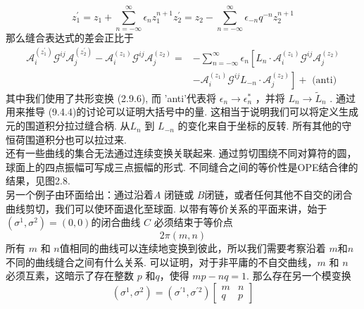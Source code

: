 \begin{subequations}
\begin{equation}
		z_{1}^{\prime}=z_{1}+\sum_{n=-\infty}^{\infty} \epsilon_{n} z_{1}^{n+1} 
\end{equation}
\begin{equation}		
		z_{2}^{\prime}=z_{2}-\sum_{n=-\infty}^{\infty} \epsilon_{-n} q^{-n} z_{2}^{n+1}
\end{equation}
\end{subequations}
那么缝合表达式的差会正比于
\begin{equation}
	\begin{aligned}
		\mathscr{A}_{i}^{\left(z_{1}^{\prime}\right)} \mathscr{G}^{i j} \mathscr{A}_{j}^{\left(z_{2}^{\prime}\right)}-\mathscr{A}_{i}^{\left(z_{1}\right)} \mathscr{G}^{i j} \mathscr{A}_{j}^{\left(z_{2}\right)}=&-\sum_{n=-\infty}^{\infty} \epsilon_{n}\left[L_{n} \cdot \mathscr{A}_{i}^{\left(z_{1}\right)} \mathscr{G}^{i j} \mathscr{A}_{j}^{\left(z_{2}\right)}\right.\\
		&\left.-\mathscr{A}_{i}^{\left(z_{1}\right)} \mathscr{G}^{i j} L_{-n} \cdot \mathscr{A}_{j}^{\left(z_{2}\right)}\right]+\text { (anti) }
	\end{aligned}
\end{equation}
其中我们使用了共形变换 (2.9.6), 而 'anti'代表将 $\epsilon_{n} \rightarrow \epsilon_{n}^{*}$ ，并将 $L_{n} \rightarrow \tilde{L}_{n} $ . 通过用来推导 (9.4.4)的讨论可以证明大括号中的量. 这相当于说明我们可以将定义生成元的围道积分拉过缝合柄. 从$L_{n}$ 到 $L_{-n}$ 的变化来自于坐标的反转. 所有其他的守恒荷围道积分也可以拉过来.\\
还有一些曲线的集合无法通过连续变换关联起来. 通过剪切围绕不同对算符的圆，球面上的四点振幅可写成三点振幅的形式. 不同缝合之间的等价性是OPE结合律的结果，见图2.8.\\
另一个例子由环面给出：通过沿着$A$ 闭链或 $B$闭链，或者任何其他不自交的闭合曲线剪切，我们可以使环面退化至球面. 以带有等价关系的平面来讲，始于 $\left(\sigma^{1}, \sigma^{2}\right)=(0,0)$的闭合曲线  $C$ 必须结束于等价点
\begin{equation}
	2 \pi(m, n)
\end{equation}
所有 $m$ 和 $n$值相同的曲线可以连续地变换到彼此，所以我们需要考察沿着 $m$和$n $不同的曲线缝合之间有什么关系. 可以证明，对于非平庸的不自交曲线，$m$ 和 $n$ 必须互素，这暗示了存在整数 $p$ 和$q$，使得 $m p-n q=1 $. 那么存在另一个模变换
\begin{equation}
	\left(\sigma^{1}, \sigma^{2}\right)=\left(\sigma^{\prime 1}, \sigma^{\prime 2}\right)\left[\begin{array}{cc}
		m & n \\
		q & p
	\end{array}\right]
\end{equation}
